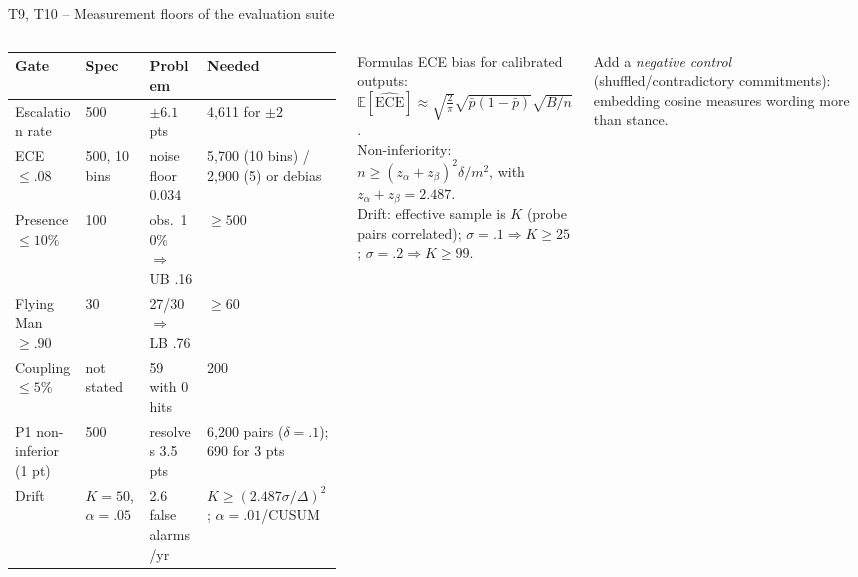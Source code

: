 \documentclass[aspectratio=169,10pt]{beamer}
\newcommand{\E}{\mathbb{E}}
\begin{document}
\begin{frame}{T9, T10 -- Measurement floors of the evaluation suite}
\begin{columns}[T]
\scriptsize
\begin{tabular}{@{}p{1.9cm}p{1.2cm}p{2.1cm}p{2.1cm}@{}}
\toprule
Gate & Spec & Problem & Needed\\\midrule
Escalation rate & 500 & $\pm6.1$ pts & 4,611 for $\pm2$\\
ECE $\le.08$ & 500, 10 bins & noise floor 0.034 & 5,700 (10 bins) / 2,900 (5) or debias\\
Presence $\le10\%$ & 100 & obs.\ 10\% $\Rightarrow$ UB .16 & $\ge500$\\
Flying Man $\ge.90$ & 30 & 27/30 $\Rightarrow$ LB .76 & $\ge60$\\
Coupling $\le5\%$ & not stated & 59 with 0 hits & 200\\
P1 non-inferior (1 pt) & 500 & resolves 3.5 pts & 6,200 pairs ($\delta{=}.1$); 690 for 3 pts\\
Drift & $K{=}50$, $\alpha{=}.05$ & 2.6 false alarms/yr & $K\ge(2.487\sigma/\Delta)^2$; $\alpha{=}.01$/CUSUM\\\bottomrule
\end{tabular}
\begin{block}{Formulas}
\scriptsize
ECE bias for calibrated outputs:\\
$\E[\widehat{\mathrm{ECE}}]\approx\sqrt{\tfrac2\pi}\sqrt{\bar p(1{-}\bar p)}\sqrt{B/n}$.\\[2pt]
Non-inferiority: $n\ge(z_\alpha{+}z_\beta)^2\delta/m^2$, with $z_\alpha{+}z_\beta{=}2.487$.\\[2pt]
Drift: effective sample is $K$ (probe pairs correlated); $\sigma{=}.1\Rightarrow K{\ge}25$; $\sigma{=}.2\Rightarrow K{\ge}99$.
\end{block}
\scriptsize Add a \emph{negative control} (shuffled/contradictory commitments): embedding cosine measures wording more than stance.
\end{columns}
\end{frame}
\end{document}
